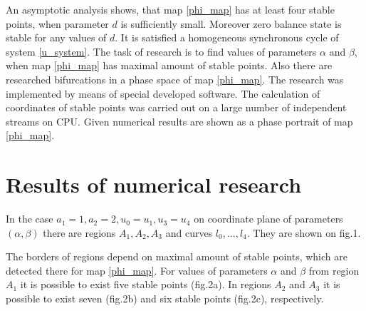 \documentclass[12pt]{amsart}
\begin{document}
An asymptotic analysis shows, that map \eqref{phi_map} has at least four stable points, when parameter $ d $ is sufficiently small. Moreover zero balance state is stable for any values of $ d $. It is satisfied a homogeneous synchronous cycle of system \eqref{u_system}. The task of research is to find values of parameters $ \alpha $ and $ \beta $, when map \eqref{phi_map} has maximal amount of stable points. Also there are researched bifurcations in a phase space of map \eqref{phi_map}. The research was implemented by means of special developed software. The calculation of coordinates of stable points was carried out on a large number of independent streams on CPU. Given numerical results are shown as a phase portrait of map \eqref{phi_map}.

\section{Results of numerical research}\label{sec:2}

In the case $ a_1 = 1, a_2 = 2, u_0 = u_1, u_3 = u_4 $ on coordinate plane of parameters $ (\alpha, \beta) $ there are regions $ A_1, A_2, A_3 $ and curves $ l_0, ..., l_4 $. They are shown on fig.1.

\hspace{1.5cm}
\begin{minipage}[h]{0.65\linewidth}
\end{minipage}
\vspace{0.1cm}

The borders of regions depend on maximal amount of stable points, which are detected there for map \eqref{phi_map}. For values of parameters $ \alpha $ and $ \beta $ from region $ A_1 $ it is possible to exist five stable points (fig.2a). In regions $ A_2 $ and $ A_3 $ it is possible to exist seven (fig.2b) and six stable points (fig.2c), respectively.
\end{document}
